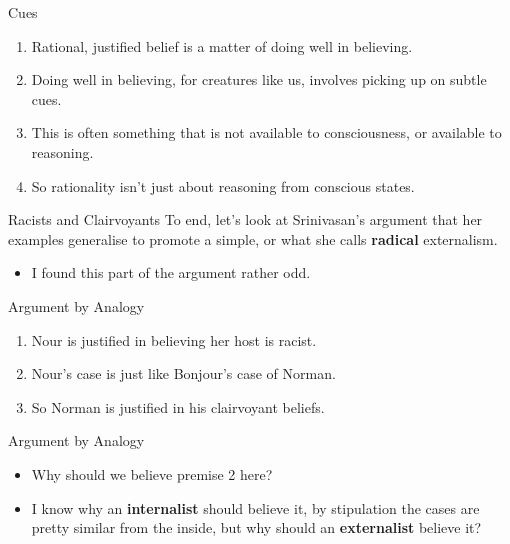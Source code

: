 \documentclass[
  17pt,
  letterpaper,
  ignorenonframetext,
  aspectratio=169,
  handout]{beamer}
\providecommand{\tightlist}{%
  \setlength{\itemsep}{0pt}\setlength{\parskip}{0pt}}\usepackage{longtable,booktabs,array}
\begin{document}
\begin{frame}{Cues}
\protect\hypertarget{cues-1}{}
\begin{enumerate}[<+->]
\tightlist
\item
  Rational, justified belief is a matter of doing well in believing.
\item
  Doing well in believing, for creatures like us, involves picking up on
  subtle cues.
\item
  This is often something that is not available to consciousness, or
  available to reasoning.
\item
  So rationality isn't just about reasoning from conscious states.
\end{enumerate}
\end{frame}

\begin{frame}{Racists and Clairvoyants}
\protect\hypertarget{racists-and-clairvoyants}{}
To end, let's look at Srinivasan's argument that her examples generalise
to promote a simple, or what she calls \textbf{radical} externalism.

\begin{itemize}[<+->]
\tightlist
\item
  I found this part of the argument rather odd.
\end{itemize}
\end{frame}

\begin{frame}{Argument by Analogy}
\protect\hypertarget{argument-by-analogy}{}
\begin{enumerate}[<+->]
\tightlist
\item
  Nour is justified in believing her host is racist.
\item
  Nour's case is just like Bonjour's case of Norman.
\item
  So Norman is justified in his clairvoyant beliefs.
\end{enumerate}
\end{frame}

\begin{frame}{Argument by Analogy}
\protect\hypertarget{argument-by-analogy-1}{}
\begin{itemize}[<+->]
\tightlist
\item
  Why should we believe premise 2 here?
\item
  I know why an \textbf{internalist} should believe it, by stipulation
  the cases are pretty similar from the inside, but why should an
  \textbf{externalist} believe it?
\end{itemize}
\end{frame}
\end{document}
